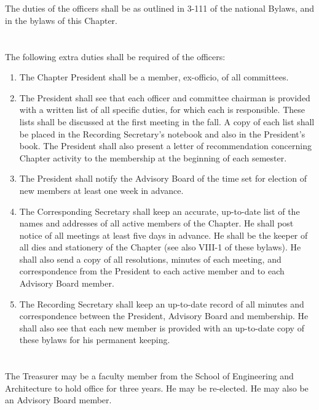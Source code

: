 \documentclass[12pt]{constitution}
\begin{document}
\section{}
The duties of the officers shall be as outlined in 3-111 of the national Bylaws, and in the bylaws of this Chapter. 
\section{}
The following extra duties shall be required of the officers:
\begin{enumerate}
	\item The Chapter President shall be a member, ex-officio, of all committees. 
	\item The President shall see that each officer and committee chairman is provided with a written list of all specific duties, for which each is responsible. These lists shall be discussed at the first meeting in the fall. A copy of each list shall be placed in the Recording Secretary's notebook and also in the President's book. The President shall also present a letter of recommendation concerning Chapter activity to the membership at the beginning of each semester.
	\item The President shall notify the Advisory Board of the time set for election of new members at least one week in advance.
	\item The Corresponding Secretary shall keep an accurate, up-to-date list of the names
	and addresses of all active members of the Chapter. He shall post notice of all
	meetings at least five days in advance. He shall be the keeper of all dies and stationery
	of the Chapter (see also VIII-1 of these bylaws). He shall also send a copy of all
	resolutions, minutes of each meeting, and correspondence from the President to each active member and to each Advisory Board member.
	\item The Recording Secretary shall keep an up-to-date record of all minutes and correspondence between the President, Advisory Board and membership. He shall also see that each new member is provided with an up-to-date copy of these bylaws for his permanent keeping.
\end{enumerate}
\section{}
The Treasurer may be a faculty member from the School of Engineering and Architecture to hold office for three years. He may be re-elected. He may also be an Advisory Board member.
\end{document}
